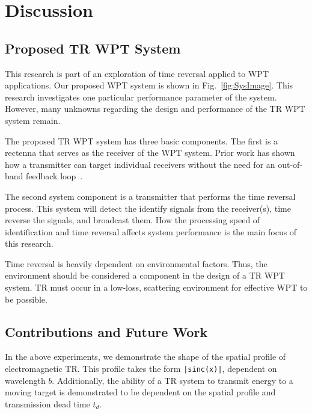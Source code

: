 \section{Discussion}
\label{sec:discussion}

\subsection{Proposed TR WPT System}
\label{sec:system}

This research is part of an exploration of time reversal applied to WPT applications. Our proposed WPT system is shown in Fig.~\ref{fig:SysImage}. This research investigates one particular performance parameter of the system. However, many unknowns regarding the design and performance of the TR WPT system remain.



The proposed TR WPT system has three basic components. The first is a rectenna
that serves as the receiver of the WPT system. Prior work has shown how a
transmitter can target individual receivers without the need for an out-of-band
feedback loop~\cite{nltr-wave-chaotic,roman}.

The second system component is a transmitter that performs the time reversal process.  This system will detect the identify signals from the receiver(s), time reverse the signals, and broadcast them.   How the processing speed of identification and time reversal affects system performance is the main focus of this research.

Time reversal is heavily dependent on environmental factors.  Thus, the environment should be considered a component in the design of a TR WPT system.  TR must occur in a low-loss, scattering environment for effective WPT to be possible.

\subsection{Contributions and Future Work}
\label{sec:contrib}

In the above experiments, we demonstrate the shape of the spatial profile of electromagnetic
TR. This profile takes the form \texttt{|sinc(x)|}, dependent on wavelength $b$.
Additionally, the ability of a TR system to transmit energy to a moving target is 
demonstrated to be dependent on the spatial profile and transmission dead 
time $t_{d}$.


